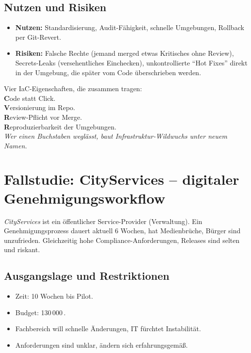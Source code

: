 \documentclass[11pt,a4paper,oneside]{article}
\newcommand{\caveatfontfallback}{\itshape}
\newcommand\caveatfont{\caveatfontfallback}%
\newcommand{\akzent}[1]{{\caveatfont\color{lpAmber}#1}}
\begin{document}
\subsection{Nutzen und Risiken}

\begin{itemize}
  \item \textbf{Nutzen:} Standardisierung, Audit-Fähigkeit, schnelle Umgebungen, Rollback per Git-Revert.
  \item \textbf{Risiken:} Falsche Rechte (jemand merged etwas Kritisches ohne Review), Secrets-Leaks (versehentliches Einchecken), unkontrollierte ``Hot Fixes'' direkt in der Umgebung, die später vom Code überschrieben werden.
\end{itemize}

\begin{eselsbox}[Eselsbrücke: \akzent{C-V-R-R}]
Vier IaC-Eigenschaften, die zusammen tragen:\\[2pt]
\textbf{C}ode statt Click.\\
\textbf{V}ersionierung im Repo.\\
\textbf{R}eview-Pflicht vor Merge.\\
\textbf{R}eproduzierbarkeit der Umgebungen.\\[2pt]
\emph{Wer einen Buchstaben weglässt, baut Infrastruktur-Wildwuchs unter neuem Namen.}
\end{eselsbox}

\section{Fallstudie: CityServices -- digitaler Genehmigungsworkflow}

\emph{CityServices} ist ein öffentlicher Service-Provider (Verwaltung). Ein Genehmigungsprozess dauert aktuell 6 Wochen, hat Medienbrüche, Bürger sind unzufrieden. Gleichzeitig hohe Compliance-Anforderungen, Releases sind selten und riskant.

\subsection{Ausgangslage und Restriktionen}

\begin{itemize}
  \item Zeit: 10 Wochen bis Pilot.
  \item Budget: 130\,000\,\text{\euro}.
  \item Fachbereich will schnelle Änderungen, IT fürchtet Instabilität.
  \item Anforderungen sind unklar, ändern sich erfahrungsgemäß.
\end{itemize}
\end{document}
